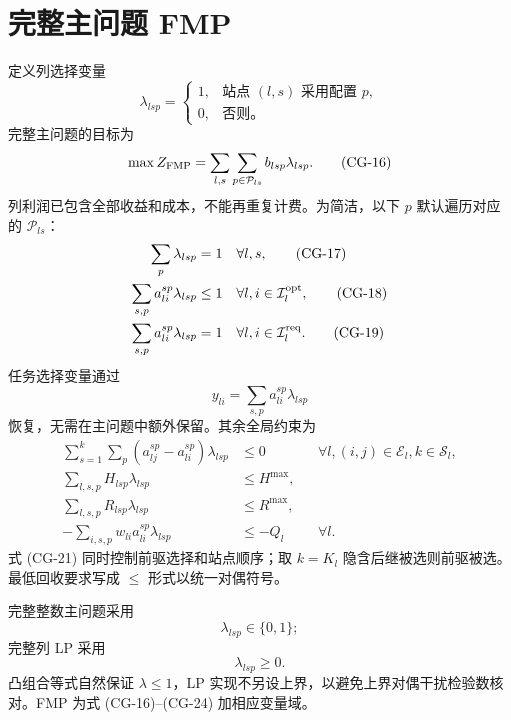 \documentclass[UTF8,a4paper,11pt]{ctexart}
\newcommand{\cg}[1]{\tag{CG-#1}}
\begin{document}
\section{完整主问题 FMP}
定义列选择变量
\begin{equation}
\lambda_{lsp}=\begin{cases}1,&\text{站点 $(l,s)$ 采用配置 $p$},\\0,&\text{否则。}\end{cases}\cg{15}
\end{equation}
完整主问题的目标为
\begin{equation}\max Z_{\rm FMP}=\sum_{l,s}\sum_{p\in\mathcal P_{ls}}b_{lsp}\lambda_{lsp}.\cg{16}\end{equation}
列利润已包含全部收益和成本，不能再重复计费。为简洁，以下 $p$ 默认遍历对应的 $\mathcal P_{ls}$：
\begin{align}
\sum_p\lambda_{lsp}&=1 &&\forall l,s,\cg{17}\\
\sum_{s,p}a_{li}^{sp}\lambda_{lsp}&\leq1 &&\forall l,i\in\mathcal I_l^{\rm opt},\cg{18}\\
\sum_{s,p}a_{li}^{sp}\lambda_{lsp}&=1 &&\forall l,i\in\mathcal I_l^{\rm req}.\cg{19}
\end{align}
任务选择变量通过
\begin{equation}y_{li}=\sum_{s,p}a_{li}^{sp}\lambda_{lsp}\cg{20}\end{equation}
恢复，无需在主问题中额外保留。其余全局约束为
\begin{align}
\sum_{s=1}^{k}\sum_p(a_{lj}^{sp}-a_{li}^{sp})\lambda_{lsp}&\leq0
&&\forall l,(i,j)\in\mathcal E_l,k\in\mathcal S_l,\cg{21}\\
\sum_{l,s,p}H_{lsp}\lambda_{lsp}&\leq H^{\max},\cg{22}\\
\sum_{l,s,p}R_{lsp}\lambda_{lsp}&\leq R^{\max},\cg{23}\\
-\sum_{i,s,p}w_{li}a_{li}^{sp}\lambda_{lsp}&\leq-Q_l &&\forall l.\cg{24}
\end{align}
式 (CG-21) 同时控制前驱选择和站点顺序；取 $k=K_l$ 隐含后继被选则前驱被选。最低回收要求写成 $\leq$ 形式以统一对偶符号。

完整整数主问题采用
\begin{equation}\lambda_{lsp}\in\{0,1\};\cg{25}\end{equation}
完整列 LP 采用
\begin{equation}\lambda_{lsp}\geq0.\cg{26}\end{equation}
凸组合等式自然保证 $\lambda\leq1$，LP 实现不另设上界，以避免上界对偶干扰检验数核对。FMP 为式 (CG-16)--(CG-24) 加相应变量域。
\end{document}

